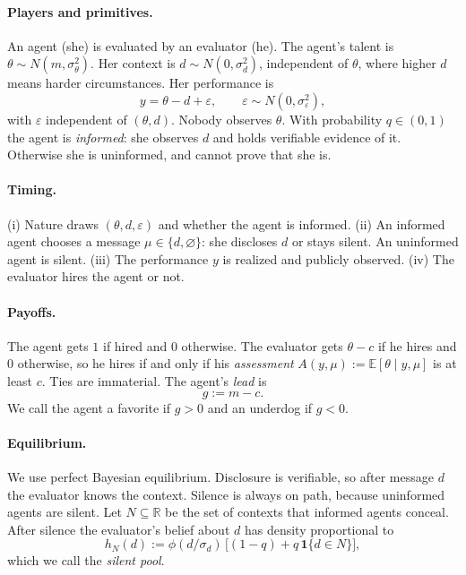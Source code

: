 \documentclass[11pt]{article}
\theoremstyle{definition}
\newcommand{\E}{\mathbb{E}}
\newcommand{\R}{\mathbb{R}}
\newcommand{\sil}{\varnothing}
\newcommand{\sd}{\sigma_d}
\newcommand{\sth}{\sigma_\theta}
\newcommand{\se}{\sigma_\varepsilon}
\begin{document}
\paragraph{Players and primitives.} An agent (she) is evaluated by an evaluator (he). The agent's talent is $\theta\sim N(m,\sth^2)$. Her context is $d\sim N(0,\sd^2)$, independent of $\theta$, where higher $d$ means harder circumstances. Her performance is
\[
y=\theta-d+\varepsilon,\qquad \varepsilon\sim N(0,\se^2),
\]
with $\varepsilon$ independent of $(\theta,d)$. Nobody observes $\theta$. With probability $q\in(0,1)$ the agent is \emph{informed}: she observes $d$ and holds verifiable evidence of it. Otherwise she is uninformed, and cannot prove that she is.

\paragraph{Timing.} (i) Nature draws $(\theta,d,\varepsilon)$ and whether the agent is informed. (ii) An informed agent chooses a message $\mu\in\{d,\sil\}$: she discloses $d$ or stays silent. An uninformed agent is silent. (iii) The performance $y$ is realized and publicly observed. (iv) The evaluator hires the agent or not.

\paragraph{Payoffs.} The agent gets $1$ if hired and $0$ otherwise. The evaluator gets $\theta-c$ if he hires and $0$ otherwise, so he hires if and only if his \emph{assessment} $A(y,\mu):=\E[\theta\mid y,\mu]$ is at least $c$. Ties are immaterial. The agent's \emph{lead} is
\[
g:=m-c .
\]
We call the agent a favorite if $g>0$ and an underdog if $g<0$.

\paragraph{Equilibrium.} We use perfect Bayesian equilibrium. Disclosure is verifiable, so after message $d$ the evaluator knows the context. Silence is always on path, because uninformed agents are silent. Let $N\subseteq\R$ be the set of contexts that informed agents conceal. After silence the evaluator's belief about $d$ has density proportional to
\[
h_N(d):=\phi(d/\sd)\,\big[(1-q)+q\,\mathbf 1\{d\in N\}\big],
\]
which we call the \emph{silent pool}.
\end{document}
